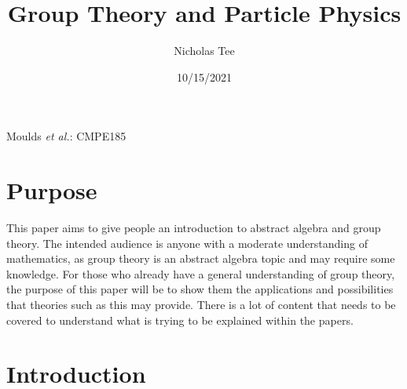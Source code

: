 \documentclass[12pt,journal,compsoc]{IEEEtran}
\begin{document}
\title{Group Theory and Particle Physics}
\author{Nicholas Tee}

\date{10/15/2021}

%
{Moulds \MakeLowercase{\textit{et al.}}: CMPE185}



\maketitle


\section{Purpose}
This paper aims to give people an introduction to abstract algebra and group theory. The intended audience is anyone with a moderate understanding of mathematics, as group theory is an abstract algebra topic and may require some knowledge. For those who already have a general understanding of group theory, the purpose of this paper will be to show them the applications and possibilities that theories such as this may provide. There is a lot of content that needs to be covered to understand what is trying to be explained within the papers.

\section{Introduction}
\end{document}
